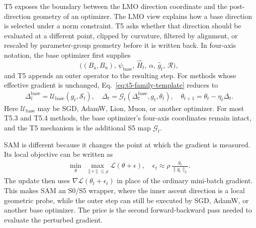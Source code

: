 T5 exposes the boundary between the LMO direction coordinate and the
post-direction geometry of an optimizer.  The LMO view explains how a base
direction is selected under a norm constraint.  T5 asks whether that direction
should be evaluated at a different point, clipped by curvature, filtered by
alignment, or rescaled by parameter-group geometry before it is written back.
In four-axis notation, the base optimizer first supplies
\begin{equation}
  \big((B_{\mathrm{a}},B_{\mathrm{u}}),\,
  \psi_{\mathrm{base}},\,\widehat{H}_t,\,
  \alpha,\,\widehat{g}_t,\,\mathcal{R}\big),
\end{equation}
and T5 appends an outer operator to the resulting step.  For methods whose
effective gradient is unchanged, Eq.~\eqref{eq:t5-family-template} reduces to
\begin{equation}
\begin{aligned}
  \Delta_t^{\mathrm{base}}
  = \mathcal{U}_{\mathrm{base}}(g_t,\mathcal{S}_t),
   \quad \Delta_t=\mathcal{G}_t\!\left(\Delta_t^{\mathrm{base}}, g_t, \theta_t\right), \quad
  \theta_{t+1}=\theta_t-\eta_t\Delta_t .
\end{aligned}
\label{eq:t5-geometry-wrapper}
\end{equation}
Here $\mathcal{U}_{\mathrm{base}}$ may be SGD, AdamW, Lion, Muon, or another
optimizer.  For most T5.3 and T5.4 methods, the base optimizer's four-axis
coordinates remain intact, and the T5 mechanism is the additional S5 map
$\mathcal{G}_t$.

SAM is different because it changes the point at which the gradient is
measured.  Its local objective can be written as
\begin{equation}
\begin{aligned}
  \min_{\theta}\ \max_{\|\epsilon\|\leq \rho}
  \mathcal{L}(\theta+\epsilon),
  \quad
  \epsilon_t
  \approx
  \rho\,\frac{g_t}{\|g_t\|_2}.
\end{aligned}
\label{eq:t5-sam-objective}
\end{equation}
The update then uses $\nabla \mathcal{L}(\theta_t+\epsilon_t)$ in place of the
ordinary mini-batch gradient.  This makes SAM an S0/S5 wrapper, where the inner
ascent direction is a local geometric probe, while the outer step can still
be executed by SGD, AdamW, or another base optimizer.  The price is the
second forward-backward pass needed to evaluate the perturbed gradient.

